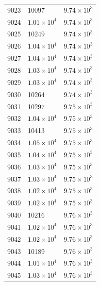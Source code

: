 \begin{table}[H]
\begin{tabular}{lll}
9023 & 10097 & $\displaystyle 9.74 \times 10^{3}$ \\
9024 & $\displaystyle 1.01 \times 10^{4}$ & $\displaystyle 9.74 \times 10^{3}$ \\
9025 & 10249 & $\displaystyle 9.74 \times 10^{3}$ \\
9026 & $\displaystyle 1.04 \times 10^{4}$ & $\displaystyle 9.74 \times 10^{3}$ \\
9027 & $\displaystyle 1.04 \times 10^{4}$ & $\displaystyle 9.74 \times 10^{3}$ \\
9028 & $\displaystyle 1.03 \times 10^{4}$ & $\displaystyle 9.74 \times 10^{3}$ \\
9029 & $\displaystyle 1.03 \times 10^{4}$ & $\displaystyle 9.74 \times 10^{3}$ \\
9030 & 10264 & $\displaystyle 9.74 \times 10^{3}$ \\
9031 & 10297 & $\displaystyle 9.75 \times 10^{3}$ \\
9032 & $\displaystyle 1.04 \times 10^{4}$ & $\displaystyle 9.75 \times 10^{3}$ \\
9033 & 10413 & $\displaystyle 9.75 \times 10^{3}$ \\
9034 & $\displaystyle 1.05 \times 10^{4}$ & $\displaystyle 9.75 \times 10^{3}$ \\
9035 & $\displaystyle 1.04 \times 10^{4}$ & $\displaystyle 9.75 \times 10^{3}$ \\
9036 & $\displaystyle 1.03 \times 10^{4}$ & $\displaystyle 9.75 \times 10^{3}$ \\
9037 & $\displaystyle 1.03 \times 10^{4}$ & $\displaystyle 9.75 \times 10^{3}$ \\
9038 & $\displaystyle 1.02 \times 10^{4}$ & $\displaystyle 9.75 \times 10^{3}$ \\
9039 & $\displaystyle 1.02 \times 10^{4}$ & $\displaystyle 9.75 \times 10^{3}$ \\
9040 & 10216 & $\displaystyle 9.76 \times 10^{3}$ \\
9041 & $\displaystyle 1.02 \times 10^{4}$ & $\displaystyle 9.76 \times 10^{3}$ \\
9042 & $\displaystyle 1.02 \times 10^{4}$ & $\displaystyle 9.76 \times 10^{3}$ \\
9043 & 10189 & $\displaystyle 9.76 \times 10^{3}$ \\
9044 & $\displaystyle 1.01 \times 10^{4}$ & $\displaystyle 9.76 \times 10^{3}$ \\
9045 & $\displaystyle 1.03 \times 10^{4}$ & $\displaystyle 9.76 \times 10^{3}$ \\

\end{tabular}
\end{table}
